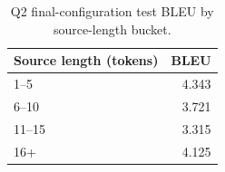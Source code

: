 \begin{table}[htbp]
\centering
\scriptsize
\caption{Q2 final-configuration test BLEU by source-length bucket.}
\label{tab:q2lengthbucket}
\begin{tabular}{lr}
\hline
Source length (tokens) & BLEU \\
\hline
1--5 & 4.343 \\
6--10 & 3.721 \\
11--15 & 3.315 \\
16+ & 4.125 \\
\hline
\end{tabular}
\end{table}
